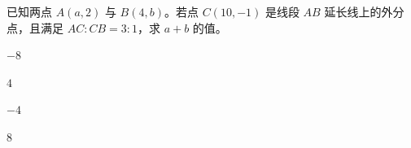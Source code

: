 \documentclass[12pt,a4paper]{exam-zh}
\begin{document}






\begin{question}
    已知两点 $A(a, 2)$ 与 $B(4, b)$。若点 $C(10, -1)$ 是线段 $AB$ 延长线上的外分点，且满足 $AC : CB = 3 : 1$，求 $a + b$ 的值。\paren[A]
    \begin{choices}
        \item $-8$
        \item $4$
        \item $-4$
        \item $8$
    \end{choices}
\end{question}
\end{document}
